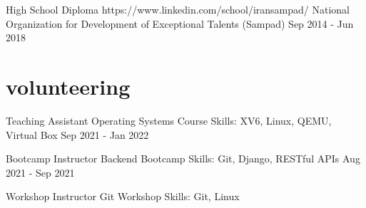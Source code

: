 \documentclass[a4paper,20pt]{article}
\begin{document}
\begin{minipage}[t]{0.3\textwidth}
{    \edu
      {High School Diploma}
      {https://www.linkedin.com/school/iransampad/}
      {National Organization for Development of Exceptional Talents (Sampad)}
      {Sep 2014 - Jun 2018}

  }
  \preparenormalsec
  \section{volunteering}
  {
    \volunteerwithdate
      {Teaching Assistant}
      {Operating Systems Course}
      {Skills: XV6, Linux, QEMU, Virtual Box}
      {Sep 2021 - Jan 2022}

    \vspace*{10pt}

    \volunteerwithdate
      {Bootcamp Instructor}
      {Backend Bootcamp}
      {Skills: Git, Django, RESTful APIs}
      {Aug 2021 - Sep 2021}

    \vspace*{10pt}

    \volunteer
      {Workshop Instructor}
      {Git Workshop}
      {Skills: Git, Linux}
  }
\end{minipage}
\hspace{20pt}
\end{document}

